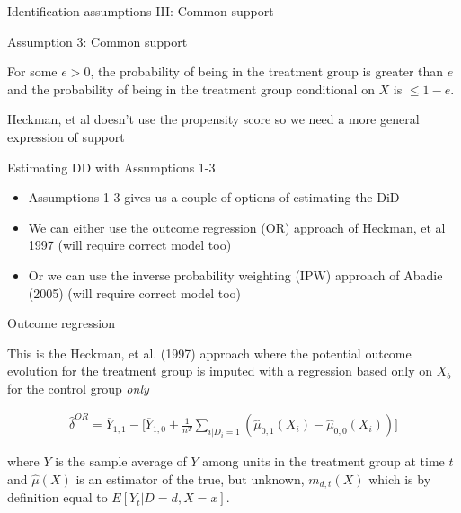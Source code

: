 \documentclass{beamer}
\begin{document}
\begin{frame}{Identification assumptions III: Common support}

Assumption 3: Common support

\bigskip

For some $e>0$, the probability of being in the treatment group is greater than $e$ and the probability of being in the treatment group conditional on $X$ is $\leq1-e$. 

\bigskip

Heckman, et al doesn't use the propensity score so we need a more general expression of support

\end{frame}

\begin{frame}{Estimating DD with Assumptions 1-3}

\begin{itemize}
\item Assumptions 1-3 gives us a couple of options of estimating the DiD
\item We can either use the outcome regression (OR) approach of Heckman, et al 1997 (will require correct model too)
\item Or we can use the inverse probability weighting (IPW) approach of Abadie (2005) (will require correct model too)
\end{itemize}

\end{frame}



\begin{frame}{Outcome regression}

This is the Heckman, et al. (1997) approach where the potential outcome evolution for the treatment group is imputed with a regression based only on $X_b$ for the control group \emph{only}

\bigskip

\begin{eqnarray*}
\widehat{\delta}^{OR} = \overline{Y}_{1,1} - \bigg [ \overline{Y}_{1,0} + \frac{1}{n^T} \sum_{i|D_i=1} ( \widehat{\mu}_{0,1}(X_i) - \widehat{\mu}_{0,0}(X_i)) \bigg ]
\end{eqnarray*}

where $\overline{Y}$ is the sample average of $Y$ among units in the treatment group at time $t$ and $\widehat{\mu}(X)$ is an estimator of the true, but unknown, $m_{d,t}(X)$ which is by definition equal to $E[Y_t|D=d,X=x]$.

\end{frame}
\end{document}
